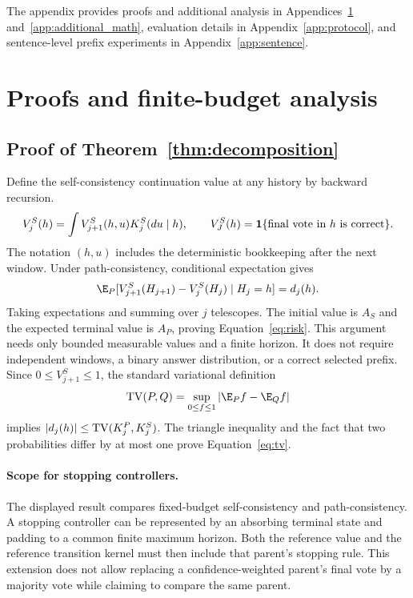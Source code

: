 \newpage
\renewcommand{\floatpagefraction}{0.9}
\noindent
The appendix provides proofs and additional analysis in Appendices~\ref{app:proofs} and~\ref{app:additional_math}, evaluation details in Appendix~\ref{app:protocol}, and sentence-level prefix experiments in Appendix~\ref{app:sentence}.

\section{Proofs and finite-budget analysis}
\label{app:proofs}
\subsection{Proof of Theorem~\ref{thm:decomposition}}
Define the self-consistency continuation value at any history by backward recursion.
\[
 V_j^S(h)=\int V_{j+1}^S(h,u)K_j^S(du\mid h),\qquad
 V_J^S(h)=\mathbf{1}\{\text{final vote in }h\text{ is correct}\}.
\]
The notation $(h,u)$ includes the deterministic bookkeeping after the next window. Under path-consistency, conditional expectation gives
\[
 \E_P[V_{j+1}^S(H_{j+1})-V_j^S(H_j)\mid H_j=h]=d_j(h).
\]
Taking expectations and summing over $j$ telescopes. The initial value is $A_S$ and the expected terminal value is $A_P$, proving Equation~\ref{eq:risk}. This argument needs only bounded measurable values and a finite horizon. It does not require independent windows, a binary answer distribution, or a correct selected prefix. Since $0\leq V_{j+1}^S\leq1$, the standard variational definition
\[
 \TV(P,Q)=\sup_{0\leq f\leq1}|\E_Pf-\E_Qf|
\]
implies $|d_j(h)|\leq\operatorname{TV}(K_j^P,K_j^S)$. The triangle inequality and the fact that two probabilities differ by at most one prove Equation~\ref{eq:tv}.

\paragraph{Scope for stopping controllers.}
The displayed result compares fixed-budget self-consistency and path-consistency. A stopping controller can be represented by an absorbing terminal state and padding to a common finite maximum horizon. Both the reference value and the reference transition kernel must then include that parent's stopping rule. This extension does not allow replacing a confidence-weighted parent's final vote by a majority vote while claiming to compare the same parent.

